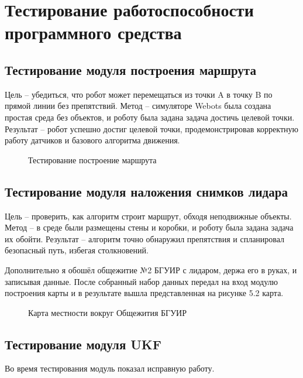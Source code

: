 \section{Тестирование работоспособности программного средства}

\subsection{Тестирование модуля построения маршрута}

Цель -- убедиться, что робот может перемещаться из точки A в точку B по прямой
линии без препятствий.
Метод -- симуляторе Webots была создана простая среда без
объектов, и роботу была задана задача достичь целевой точки.
Результат -- робот успешно достиг целевой точки, продемонстрировав корректную
работу датчиков и базового алгоритма движения.

\FloatBarrier
\begin{figure}[h]
\centering
\caption{Тестирование построение маршрута}
\end{figure}
\FloatBarrier

\subsection{Тестирование модуля наложения снимков лидара}

Цель -- проверить, как алгоритм строит маршрут, обходя неподвижные объекты.
Метод -- в среде были размещены стены и коробки, и роботу была задана задача их
обойти. Результат -- алгоритм точно обнаружил препятствия и спланировал
безопасный путь, избегая столкновений.

Дополнительно я обошёл общежитие №2 БГУИР с лидаром, держа его в руках, и записывая данные. После собранный набор данных передал на вход модулю построения карты и в результате вышла представленная на рисунке 5.2 карта.
\FloatBarrier
\begin{figure}[h]
\centering
\caption{Карта местности вокруг Общежития  БГУИР}
\end{figure}
\FloatBarrier


\subsection{Тестирование модуля UKF}

Во время тестирования модуль показал исправную работу.

